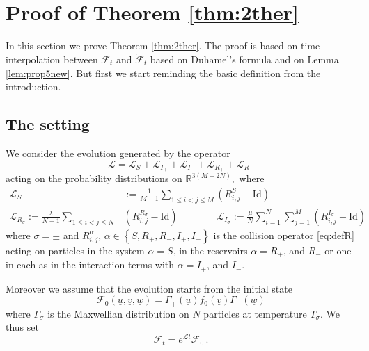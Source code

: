 \documentclass{article}
\newcommand{\scrF}{{\mathscr F}}
\newcommand \Id{\mathrm{Id}}
\newcommand*\R{ \mathds{R} }
\newcommand*\cL{ \mathcal{L} }
\newcommand\set[1]{\left\{ #1 \right\}}
\newcommand\uv{{\underline v}}
\newcommand\uu{{\underline u}}
\newcommand\uw{{\underline w}}
\begin{document}

\section{Proof of Theorem \ref{thm:2ther}}\label{sec:2ther}

In this section we prove Theorem \ref{thm:2ther}. The proof is based on time interpolation between $\scrF_t$ and
$\widetilde{\scrF}_t$ based  on Duhamel's formula and  on Lemma \ref{lem:prop5new}. But first we start reminding the basic
definition from the introduction.

\subsection{The setting}

We consider the evolution generated by the operator
\begin{equation}\label{eq:L}
\cL = \cL_S + \cL_{I_+} + \cL_{I_-} + \cL_{R_+} + \cL_{R_-}%
\end{equation}
acting on the probability distributions on $\R^{3(M + 2N )},$ where
\begin{equation}
\begin{aligned}
\cL_S &:= \frac{1}{M - 1} \sum_{1 \leq i < j \leq M} (R_{i,j}^S - \mathrm{Id})\\
\cL_{R_\sigma} := \frac{\lambda}{N - 1} \sum_{1 \leq i < j \leq N}&
(R_{i,j}^{R_\sigma} - \Id) \qquad\qquad
\cL_{I_\sigma} := \frac{\mu}{N} \sum_{i = 1}^N \sum_{j = 1}^{M}
(R_{i,j}^{I_\sigma} - \Id)%
\end{aligned}
\end{equation}
where $\sigma=\pm$ and $R_{i,j}^\alpha$, $\alpha\in\set{S,R_+,R_-,I_+,I_-}$ is
the collision operator \eqref{eq:defR}
acting on particles in the system $\alpha=S$, in the reservoirs $\alpha=R_+$, and $R_-$ or one in each as in the
interaction terms with $\alpha=I_+$, and $I_-$.

Moreover we assume that the evolution starts from the initial state
\[
\scrF_0(\uu,\uv, \uw)=\Gamma_+(\uu)f_0(\uv)\Gamma_-(\uw)
\]
where $\Gamma_\sigma$ is the Maxwellian distribution on $N$ particles at temperature 
$T_\sigma$. We thus set
\[
\scrF_t=e^{\cL t}\scrF_0\, .
\]
\end{document}
